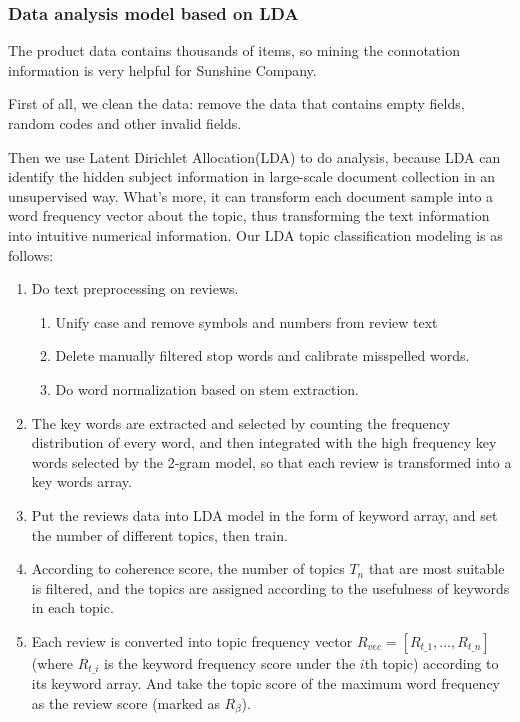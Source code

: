 \documentclass{mcmthesis}
\begin{document}
\subsubsection{Data analysis model based on LDA}
The product data contains thousands of items, so mining the connotation information is very helpful for Sunshine Company.

First of all, we clean the data: remove the data that contains empty fields, random codes and other invalid fields. 

Then we use Latent Dirichlet Allocation(LDA)\cite{blei2003latent} to do analysis, because LDA can identify the hidden subject information in large-scale document collection in an unsupervised way. What's more, it can transform each document sample into a word frequency vector about the topic, thus transforming the text information into intuitive numerical information. Our LDA topic classification modeling is as follows:
\begin{enumerate}
	\item Do text preprocessing on reviews.
		\begin{enumerate}
			\item Unify case and remove symbols and numbers from review text
			\item Delete manually filtered stop words and calibrate misspelled words.
			\item Do word normalization based on stem extraction.
		\end{enumerate}
	\item The key words are extracted and selected by counting the frequency distribution of every word, and then integrated with the high frequency key words selected by the 2-gram model\cite{zhang2006lord}, so that each review is transformed into a key words array.
	\item Put the reviews data into LDA model in the form of  keyword array, and set the number of different topics, then train.
	\item According to coherence score, the number of topics $T_{n}$ that are most suitable is filtered, and the topics are assigned according to the usefulness of keywords in each topic.
	\item Each review is converted into topic frequency vector $R_{vec}=[R_{t\_1},...,R_{t\_n}]$  (where $R_{t\_i}$ is the keyword frequency score under the $i$th topic) according to its keyword array. And take the topic score of the maximum word frequency as the review score (marked as $R_{\beta}$).
\end{enumerate}
\end{document}
